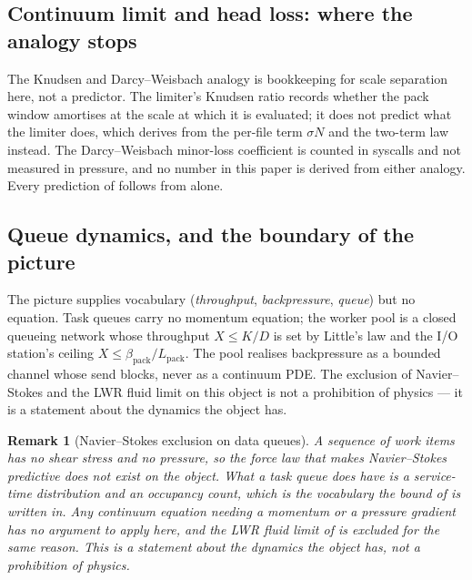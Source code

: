\documentclass[11pt,letterpaper]{article}
\newtheorem{remark}{Remark}
\begin{document}
\subsection{Continuum limit and head loss: where the analogy stops}
The Knudsen and Darcy--Weisbach analogy is bookkeeping for scale separation
here, not a predictor. The limiter's Knudsen ratio records whether the pack
window amortises at the scale at which it is evaluated; it does not predict
what the limiter does, which  derives from the per-file term
$\sigma N$ and the two-term law instead. The Darcy--Weisbach minor-loss
coefficient is counted in syscalls and not measured in pressure, and no number
in this paper is derived from either analogy. Every prediction of
 follows from  alone.

\subsection{Queue dynamics, and the boundary of the picture}
\label{sec:queue-stub}
The picture supplies vocabulary (\emph{throughput}, \emph{backpressure},
\emph{queue}) but no equation. Task queues carry no momentum equation; the
worker pool is a closed queueing network whose throughput $X\le K/D$ is
set by Little's law and the I/O station's ceiling
$X\le\beta_{\text{pack}}/L_{\text{pack}}$. The pool realises backpressure
as a bounded channel whose send blocks, never as a continuum PDE. The
exclusion of Navier--Stokes and the LWR fluid limit on this object is not
a prohibition of physics --- it is a statement about the dynamics the
object has.

\begin{remark}[Navier--Stokes exclusion on data queues]
\label{rem:nse}
A sequence of work items has no shear stress and no pressure, so the force
law that makes Navier--Stokes predictive does not exist on the object. What a
task queue does have is a service-time distribution and an occupancy count,
which is the vocabulary the bound of  is written in. Any
continuum equation needing a momentum or a pressure gradient has no argument to
apply here, and the LWR fluid limit of \cite{lwr1955,richards1956} is excluded
for the same reason. This is a statement about the dynamics the object has, not
a prohibition of physics.
\end{remark}
\end{document}
